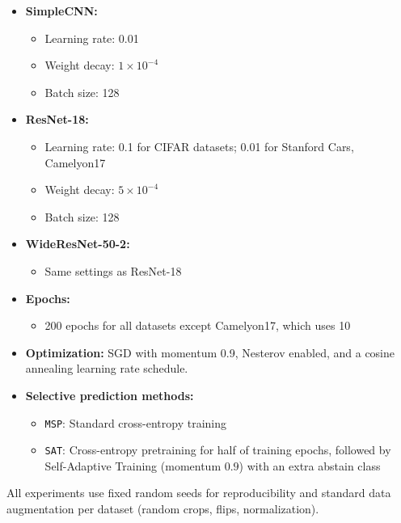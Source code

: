 \begin{itemize}[leftmargin=1em]
    \item \textbf{SimpleCNN:}
    \begin{itemize}[leftmargin=1em]
        \item Learning rate: 0.01
        \item Weight decay: \(1\times10^{-4}\)
        \item Batch size: 128
    \end{itemize}

    \item \textbf{ResNet-18:}
    \begin{itemize}[leftmargin=1em]
        \item Learning rate: 0.1 for CIFAR datasets; 0.01 for Stanford Cars, Camelyon17
        \item Weight decay: \(5\times10^{-4}\)
        \item Batch size: 128
    \end{itemize}

    \item \textbf{WideResNet-50-2:}
    \begin{itemize}[leftmargin=1em]
        \item Same settings as ResNet-18
    \end{itemize}

    \item \textbf{Epochs:}
    \begin{itemize}[leftmargin=1em]
        \item 200 epochs for all datasets except Camelyon17, which uses 10
    \end{itemize}

    \item \textbf{Optimization:} SGD with momentum 0.9, Nesterov enabled, and a cosine annealing learning rate schedule.

    \item \textbf{Selective prediction methods:}
    \begin{itemize}[leftmargin=1em]
        \item \texttt{MSP}: Standard cross-entropy training
        \item \texttt{SAT}: Cross-entropy pretraining for half of training epochs, followed by Self-Adaptive Training (momentum \(0.9\)) with an extra abstain class
    \end{itemize}
\end{itemize}

All experiments use fixed random seeds for reproducibility and standard data augmentation per dataset (random crops, flips, normalization).


